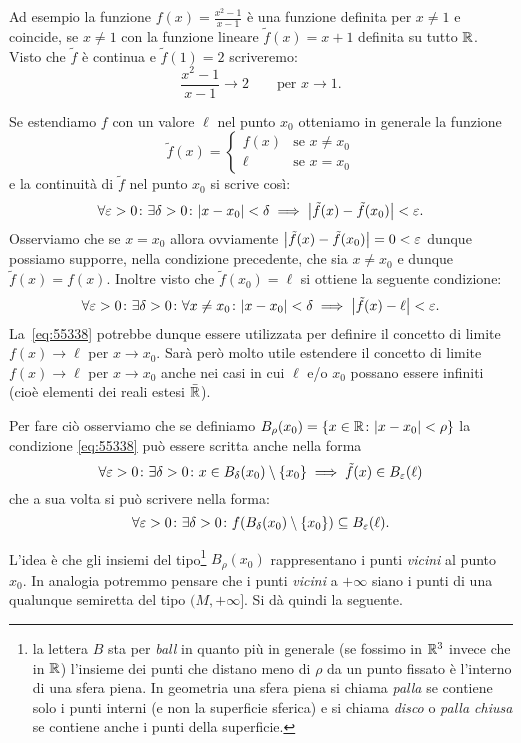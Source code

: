 Ad esempio la funzione $f(x) = \frac{x^2-1}{x-1}$ è una funzione definita per $x\neq 1$
e coincide, se $x\neq 1$ con la funzione lineare $\tilde f(x) = x+1$ definita 
su tutto $\mathbb R$. 
Visto che $\tilde f$ è continua e $\tilde f(1)=2$
scriveremo:
\[
  \frac{x^2-1}{x-1} \to 2
  \qquad \text{per $x\to 1$.}
\]

Se estendiamo $f$ con un valore $\ell$ nel punto $x_0$ otteniamo 
in generale la funzione 
\[
  \tilde f(x) = \begin{cases}
    f(x) & \text{se $x\neq x_0$}\\
    \ell & \text{se $x=x_0$}
  \end{cases}  
\]
e la continuità di $\tilde f$ nel punto $x_0$ si scrive così:
\[
\forall\varepsilon>0\colon \exists \delta>0\colon
{\left|x-x_0\right|}<\delta \implies {\left|\tilde f(x)-\tilde f(x_0)\right|}<\varepsilon.  
\]
Osserviamo che se $x=x_0$ allora ovviamente ${\left|\tilde f(x)-\tilde f(x_0)\right|}
= 0 < \varepsilon$ dunque possiamo supporre, nella condizione precedente, 
che sia $x\neq x_0$ e dunque $\tilde f(x)=f(x)$. 
Inoltre visto che $\tilde f(x_0)=\ell$ si ottiene 
la seguente condizione:
\begin{equation}\label{eq:55338}
\forall \varepsilon>0\colon \exists \delta >0 \colon 
  \forall x\neq x_0\colon
  {\left|x-x_0\right|}<\delta \implies {\left|\tilde f(x) - \ell\right|} < \varepsilon.
\end{equation}
La~\eqref{eq:55338} potrebbe dunque essere utilizzata per definire 
il concetto di limite $f(x)\to \ell$ per $x\to x_0$.
Sarà però molto utile estendere il concetto di limite $f(x)\to \ell$ 
per $x\to x_0$ anche nei casi in cui $\ell$ e/o $x_0$ possano 
essere infiniti (cioè elementi dei reali estesi $\bar {\mathbb R}$).

Per fare ciò osserviamo che
se definiamo $B_\rho(x_0) = {\left\{ x\in \mathbb R \colon {\left|x-x_0\right|}<\rho \right\}}$
la condizione \eqref{eq:55338}
può essere scritta anche nella forma 
\[
  \forall \varepsilon>0\colon \exists \delta >0 \colon 
  x \in B_\delta(x_0)\setminus{\left\{ x_0 \right\}} \implies \tilde f(x) \in B_\varepsilon(\ell)  
\]
che a sua volta si può scrivere nella forma:
\[
  \forall \varepsilon>0\colon \exists \delta >0 \colon 
  f(B_\delta(x_0)\setminus{\left\{ x_0 \right\}}) \subseteq  B_\varepsilon(\ell).    
\]

L'idea è che gli insiemi del tipo\footnote{%
la lettera $B$ sta per \emph{ball} in quanto 
più in generale (se fossimo in $\mathbb R^3$ invece che in $\mathbb R$)
l'insieme dei punti che distano meno di $\rho$ da un punto fissato 
è l'interno di una sfera piena. 
In geometria una sfera piena si chiama \emph{palla} 
se contiene solo i punti interni (e non la superficie sferica)
e si chiama \emph{disco} o \emph{palla chiusa} se contiene 
anche i punti della superficie.
}%
$B_\rho(x_0)$ 
rappresentano i punti \emph{vicini} al punto $x_0$. 
In analogia potremmo pensare che i punti \emph{vicini} 
a $+\infty$ siano i punti di una qualunque semiretta 
del tipo $(M,+\infty]$.
Si dà quindi la seguente.


